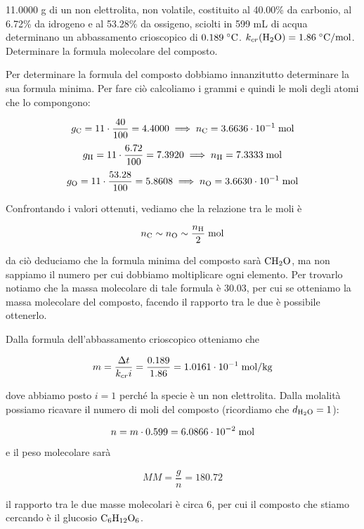 \begin{esercizio}
    11.0000 g di un non elettrolita, non volatile, costituito al 40.00\% da carbonio, al 6.72\% da idrogeno e al 53.28\% da ossigeno, sciolti in 599 mL di acqua determinano un abbassamento crioscopico di $0.189 \; ^{\circ} \rm C$. $k_{cr}(\text{H}_2\text{O})=1.86 \; ^{\circ} \rm C/mol$. Determinare la formula molecolare del composto.
\end{esercizio}
\begin{soluzione}
    Per determinare la formula del composto dobbiamo innanzitutto determinare la sua formula minima. Per fare ciò calcoliamo i grammi e quindi le moli degli atomi che lo compongono:

$$g_{\rm C}=11 \cdot \frac{40}{100}=4.4000
\implies
n_{\rm C}=3.6636 \cdot 10^{-1} \; \text{mol}$$
$$g_{\rm H}=11 \cdot \frac{6.72}{100}=7.3920
\implies
n_{\rm H}=7.3333 \; \text{mol}$$
$$g_{\rm O}=11 \cdot \frac{53.28}{100}=5.8608
\implies
n_{\rm O}=3.6630 \cdot 10^{-1} \; \text{mol}$$

Confrontando i valori ottenuti, vediamo che la relazione tra le moli è

$$n_{\rm C} \sim n_{\rm O} \sim \frac{n_{\rm H}}{2} \; \rm mol$$

da ciò deduciamo che la formula minima del composto sarà $\rm CH_2O$, ma non sappiamo il numero per cui dobbiamo moltiplicare ogni elemento. Per trovarlo notiamo che la massa molecolare di tale formula è 30.03, per cui se otteniamo la massa molecolare del composto, facendo il rapporto tra le due è possibile ottenerlo.

Dalla formula dell'abbassamento crioscopico otteniamo che

$$m=\frac{\Delta t}{k_{cr} i}=\frac{0.189}{1.86}
=1.0161 \cdot 10^{-1} \; \rm mol/kg$$

dove abbiamo posto $i=1$ perché la specie è un non elettrolita. Dalla molalità possiamo ricavare il numero di moli del composto (ricordiamo che $d_{\rm H_2O}=1$):

$$n=m \cdot 0.599=6.0866 \cdot 10^{-2} \; \rm mol$$

e il peso molecolare sarà

$$MM=\frac{g}{n}=180.72$$

il rapporto tra le due masse molecolari è circa 6, per cui il composto che stiamo cercando è il glucosio $\rm C_6H_{12}O_6$.
\end{soluzione}

\newpage

